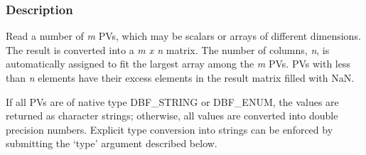 \documentclass{article}
\newcommand{\NAN}{\mbox{NaN}}
\newcommand{\ita}[1]{\emph{#1}}
\newcommand{\m}{$m$}
\newcommand{\n}{$n$}
\newcommand{\mxn}{$m\times n$}
\renewcommand{\m}{\ita{m}}
\renewcommand{\n}{\ita{n}}
\renewcommand{\mxn}{\ita{m x n}}
\begin{document}
\subsubsection{Description}
Read a number of \m{} PVs, which may be scalars or arrays of
different dimensions. The result is converted into a \mxn{}
matrix. The number of columns, \n, is automatically assigned
to fit the largest array among the \m{} PVs.  PVs with less than
\n{} elements have their excess elements in the result matrix
filled with \NAN.

If all PVs are of native type DBF\_STRING or DBF\_ENUM, the
values are returned as character strings; otherwise,
all values are converted into double precision numbers.
Explicit type conversion into strings can be enforced by submitting
the `type' argument described below.
\end{document}

